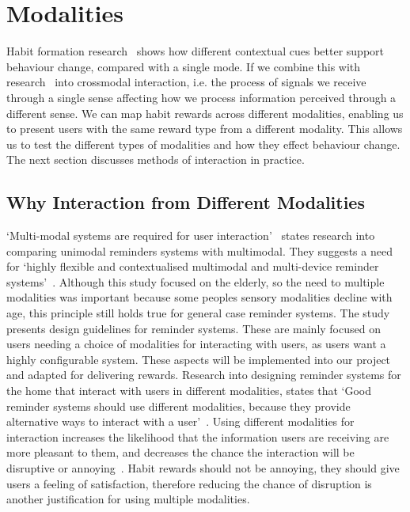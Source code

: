 
\newpage

\section{Modalities}
Habit formation research~\cite{article_understanding_use_contextual_cues_design_impl} shows how different contextual cues better support behaviour change, compared with a single mode.
If we combine this with research~\cite{article_natural_cross_modal_mappings} into crossmodal interaction,
i.e. the process of signals we receive through a single sense affecting how we process information perceived through a different sense.
We can map habit rewards across different modalities, enabling us to present users with the same reward type from a different modality.
This allows us to test the different types of modalities and how they effect behaviour change.
The next section discusses methods of interaction in practice.

\subsection{Why Interaction from Different Modalities}
`Multi-modal systems are required for user interaction'~\cite{article_user_centred_multimodal_reminders} states research into comparing unimodal reminders systems with multimodal.
They suggests a need for `highly flexible and contextualised multimodal and multi-device reminder systems'~\cite{article_user_centred_multimodal_reminders}.
Although this study focused on the elderly, so the need to multiple modalities was important because some peoples sensory modalities decline with age,
this principle still holds true for general case reminder systems. The study presents design guidelines for reminder systems.
These are mainly focused on users needing a choice of modalities for interacting with users, as users want a highly configurable system.
These aspects will be implemented into our project and adapted for delivering rewards.\newline
\newline
Research into designing reminder systems for the home that interact with users in different modalities, states that
`Good reminder systems should use different modalities, because they provide alternative ways to interact with a user'~\cite{article_designing_multimodal_reminders_for_home}.
Using different modalities for interaction increases the likelihood that the information users are receiving are more pleasant to them,
and decreases the chance the interaction will be disruptive or annoying~\cite{article_designing_multimodal_reminders_for_home}.
Habit rewards should not be annoying, they should give users a feeling of satisfaction, therefore reducing the chance of disruption is another justification for using multiple modalities.

